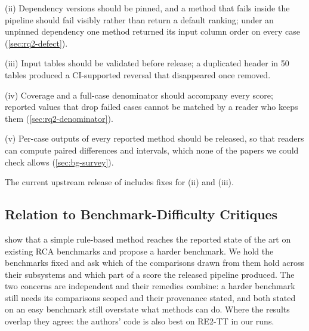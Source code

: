(ii) Dependency versions should be pinned, and a method that fails inside the pipeline should fail visibly rather than return a default ranking; under an unpinned dependency one method returned its input column order on every case (\cref{sec:rq2-defect}).

(iii) Input tables should be validated before release; a duplicated header in 50 tables produced a CI-supported reversal that disappeared once removed.

(iv) Coverage and a full-case denominator should accompany every score; reported values that drop failed cases cannot be matched by a reader who keeps them (\cref{sec:rq2-denominator}).

(v) Per-case outputs of every reported method should be released, so that readers can compute paired differences and intervals, which none of the papers we could check allows (\cref{sec:bg-survey}).

The current upstream release of \rcaeval includes fixes for (ii) and (iii).

\subsection{Relation to Benchmark-Difficulty Critiques}
\label{sec:disc-fang}

\citet{fang2025simplerca} show that a simple rule-based method reaches the reported state of the art on existing RCA benchmarks and propose a harder benchmark.
We hold the benchmarks fixed and ask which of the comparisons drawn from them hold across their subsystems and which part of a score the released pipeline produced.
The two concerns are independent and their remedies combine: a harder benchmark still needs its comparisons scoped and their provenance stated, and both stated on an easy benchmark still overstate what methods can do.
Where the results overlap they agree: the authors' \simplerca code is also best on RE2-TT in our runs.
